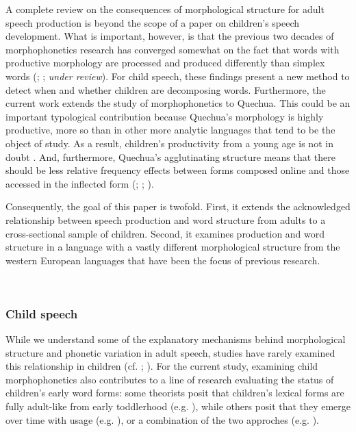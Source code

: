 \documentclass[a4paper,man,floatsintext,natbib,donotrepeattitle, apacite]{apa6}
\begin{document}
A complete  review on the consequences of morphological structure for adult speech production is beyond the scope of a paper on children's speech development. What is important, however, is that the previous two decades of morphophonetics research has converged somewhat on the fact that words with productive morphology are processed and produced differently than simplex words (\citealt{kempsProsodicCuesMorphological2005}; \citealt{plagPhonologicalPhoneticVariability2014}; \citeauthor{tomaschekHowAnticipatoryCoarticulation2019} \textit{under review}). For child speech, these findings present a new method to detect when and whether children are decomposing words. Furthermore, the current work extends the study of morphophonetics to Quechua. This could be an important typological contribution because Quechua's morphology is highly productive, more so than in other more analytic languages that tend to be the object of study. As a result, children's productivity from a young age is not in doubt \citep{courtneyLearningConstructVerbs2002}. And, furthermore, Quechua's agglutinating structure means that there should be less relative frequency effects between forms composed online and those accessed in the inflected form (\citealt{baayenQuantitativeAspectsMorphological1992}; \citealt{hayCausesConsequencesWord2003}; \citealt{pinkerFutureTense2002}). 

Consequently, the goal of this paper is twofold. First, it extends the acknowledged relationship between speech production and word structure from adults to a cross-sectional sample of children. Second, it examines production and word structure in a language with a vastly different morphological structure from the western European languages that have been the focus of previous research.   

~
~

\subsubsection{Child speech}\label{child-morph}

While we understand some of the explanatory mechanisms behind morphological structure and phonetic variation in adult speech, studies have rarely examined this relationship in children (cf. \citealt{songDurationalCuesFricative2013}; \citealt{songEffectsCoarticulationMorphological2013}). For the current study, examining child morphophonetics also contributes to a line of research evaluating the status of children's early word forms:  some theorists posit that children's lexical forms are fully adult-like from early toddlerhood (e.g. \citealt{wexlerVeryEarlyParameter1998}), while others posit that they emerge over time with usage (e.g. \citealt{ambridgeUbiquityFrequencyEffects2015}), or a combination of the two approches (e.g. \citealt{swingleyLexicalNeighborhoodsWordForm2002}). 
\end{document}
